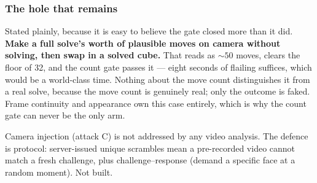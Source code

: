 \subsubsection{The hole that remains}

Stated plainly, because it is easy to believe the gate closed more than it
did. \textbf{Make a full solve's worth of plausible moves on camera without
solving, then swap in a solved cube.} That reads as ${\sim}50$ moves, clears
the floor of 32, and the count gate passes it --- eight seconds of flailing
suffices, which would be a world-class time. Nothing about the move count
distinguishes it from a real solve, because the move count is genuinely real;
only the outcome is faked. Frame continuity and appearance own this case
entirely, which is why the count gate can never be the only arm.

Camera injection (attack C) is not addressed by any video analysis. The
defence is protocol: server-issued unique scrambles mean a pre-recorded video
cannot match a fresh challenge, plus challenge--response (demand a specific
face at a random moment). Not built.
